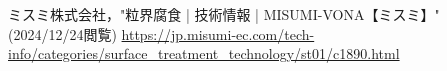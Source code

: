 \begin{thebibliography}{99}
     ミスミ株式会社，"粒界腐食 | 技術情報 | MISUMI-VONA【ミスミ】"(2024/12/24閲覧)
    \url{https://jp.misumi-ec.com/tech-info/categories/surface_treatment_technology/st01/c1890.html}
    
\end{thebibliography}
